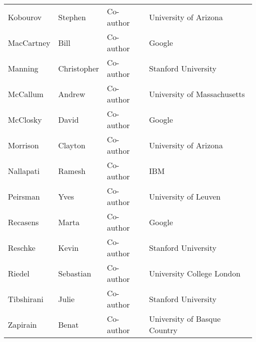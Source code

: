 \documentclass[10pt]{article}
\begin{document}
\begin{description}
\begin{center}
\begin{tabular}{l|l|l|l}
Kobourov & Stephen & Co-author & University of Arizona \\
MacCartney & Bill & Co-author & Google \\
Manning & Christopher & Co-author & Stanford University \\
McCallum & Andrew & Co-author & University of Massachusetts  \\
McClosky & David & Co-author & Google  \\
Morrison & Clayton & Co-author &  University of Arizona \\
Nallapati & Ramesh & Co-author & IBM \\
Peirsman &  Yves & Co-author & University of Leuven \\
Recasens & Marta & Co-author & Google \\
Reschke & Kevin & Co-author & Stanford University \\
Riedel & Sebastian & Co-author & University College London \\
Tibshirani & Julie & Co-author & Stanford University \\
Zapirain & Benat & Co-author & University of Basque Country \\


\end{tabular}
\end{center}


\end{description}
\end{document}
